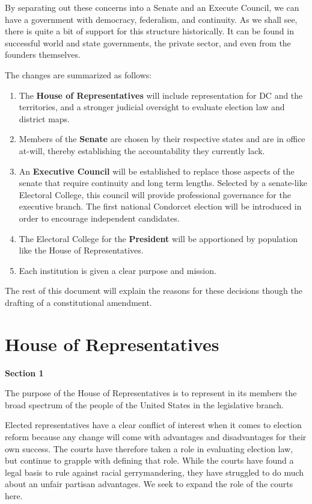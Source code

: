 \documentclass{article}
\begin{document}
By separating out these concerns into a Senate and an Execute Council, we can have a government with democracy, federalism, and continuity. As we shall see, there is quite a bit of support for this structure historically. It can be found in successful world and state governments, the private sector, and even from the founders themselves.

The changes are summarized as follows:
\begin{enumerate}
  \item The \textbf{House of Representatives} will include representation for DC and the territories, and a stronger judicial oversight to evaluate election law and district maps.
  \item Members of the \textbf{Senate} are chosen by their respective states and are in office at-will, thereby establishing the accountability they currently lack.
  \item An \textbf{Executive Council} will be established to replace those aspects of the senate that require continuity and long term lengths. Selected by a senate-like Electoral College, this council will provide professional governance for the executive branch. The first national Condorcet election will be introduced in order to encourage independent candidates.
  \item The Electoral College for the \textbf{President} will be apportioned by population like the House of Representatives.
 \item Each institution is given a clear purpose and mission.
\end{enumerate}

The rest of this document will explain the reasons for these decisions though the drafting of a constitutional amendment.

\section{House of Representatives}

\begin{quoting}
\textbf{Section 1}

The purpose of the House of Representatives is to represent in its members the broad spectrum of the people of the United States in the legislative branch.
\end{quoting}

Elected representatives have a clear conflict of interest when it comes to election reform because any change will come with advantages and disadvantages for their own success. The courts have therefore taken a role in evaluating election law, but continue to grapple with defining that role. While the courts have found a legal basis to rule against racial gerrymandering, they have struggled to do much about an unfair partisan advantages\cite{Brewer}. We seek to expand the role of the courts here.
\end{document}
